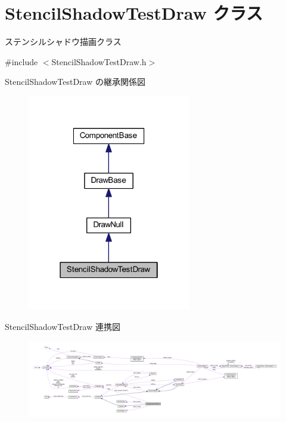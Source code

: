 \hypertarget{class_stencil_shadow_test_draw}{}\section{Stencil\+Shadow\+Test\+Draw クラス}
\label{class_stencil_shadow_test_draw}


ステンシルシャドウ描画クラス  




{\ttfamily \#include $<$Stencil\+Shadow\+Test\+Draw.\+h$>$}



Stencil\+Shadow\+Test\+Draw の継承関係図\nopagebreak
\begin{figure}[H]
\begin{center}
\leavevmode
\includegraphics[width=202pt]{class_stencil_shadow_test_draw__inherit__graph}
\end{center}
\end{figure}


Stencil\+Shadow\+Test\+Draw 連携図\nopagebreak
\begin{figure}[H]
\begin{center}
\leavevmode
\includegraphics[width=350pt]{class_stencil_shadow_test_draw__coll__graph}
\end{center}
\end{figure}
